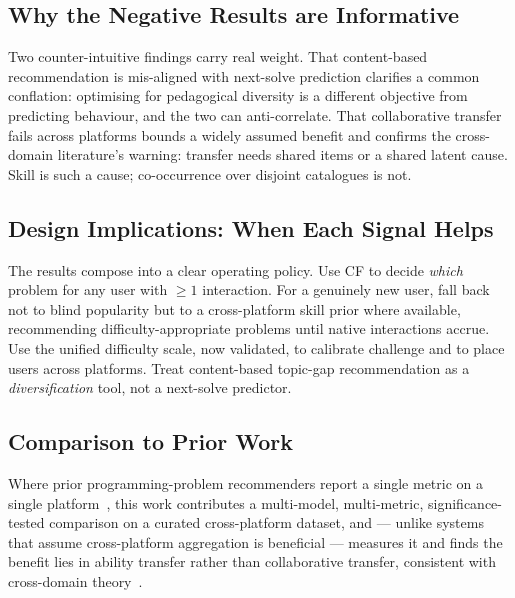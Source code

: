 \documentclass[12pt,a4paper]{article}
\begin{document}
\subsection{Why the Negative Results are Informative}
Two counter-intuitive findings carry real weight. That content-based recommendation is
mis-aligned with next-solve prediction clarifies a common conflation: optimising for
pedagogical diversity is a different objective from predicting behaviour, and the two can
anti-correlate. That collaborative transfer fails across platforms bounds a widely assumed benefit and
confirms the cross-domain literature's warning: transfer needs shared items or a shared
latent cause. Skill is such a cause; co-occurrence over disjoint catalogues is not.

\subsection{Design Implications: When Each Signal Helps}
The results compose into a clear operating policy. Use CF to decide \emph{which} problem
for any user with $\geq1$ interaction. For a genuinely new user, fall back not to blind
popularity but to a cross-platform skill prior where available, recommending
difficulty-appropriate problems until native interactions accrue. Use the unified
difficulty scale, now validated, to calibrate challenge and to place users across
platforms. Treat content-based topic-gap recommendation as a \emph{diversification} tool,
not a next-solve predictor.

\subsection{Comparison to Prior Work}
Where prior programming-problem recommenders report a single metric on a single
platform~\cite{yera2018,zhao2018}, this work contributes a multi-model, multi-metric,
significance-tested comparison on a curated cross-platform dataset, and --- unlike systems
that assume cross-platform aggregation is beneficial --- measures it and finds the benefit
lies in ability transfer rather than collaborative transfer, consistent with cross-domain
theory~\cite{cantador2015,pan2010}.
\end{document}
